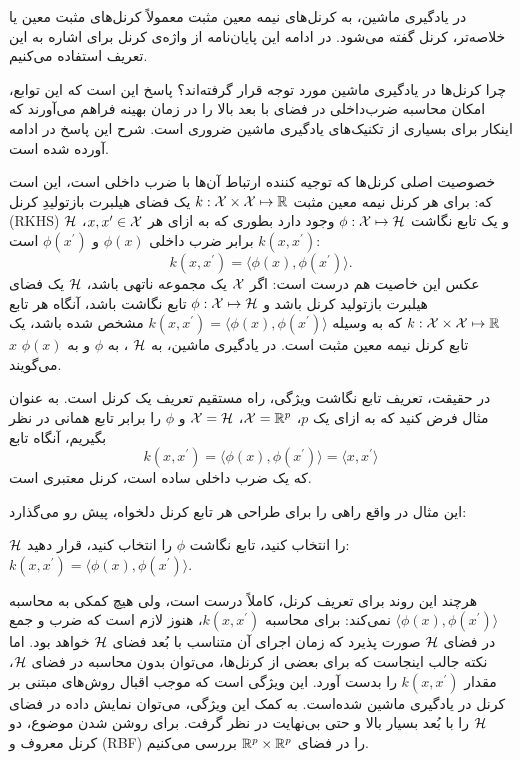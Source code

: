 در یادگیری ماشین، به کرنل‌های نیمه معین مثبت معمولاً کرنل‌های مثبت معین یا خلاصه‌تر، کرنل گفته می‌شود. در ادامه این پایان‌نامه از واژه‌ی کرنل برای اشاره به این تعریف استفاده می‌کنیم.

چرا کرنل‌ها در یادگیری ماشین مورد توجه قرار گرفته‌اند؟ پاسخ این است که این توابع، امکان محاسبه ضرب‌داخلی در فضای با بعد بالا را در زمان بهینه فراهم می‌آورند که اینکار برای بسیاری از تکنیک‌های یادگیری ماشین ضروری است. شرح این پاسخ در ادامه آورده شده است.

خصوصیت اصلی کرنل‌ها که توجیه کننده ارتباط آن‌ها با ضرب داخلی است، این است که: برای هر کرنل نیمه معین مثبت $k: \mathcal{X} \times \mathcal{X} \mapsto \mathbb{R}$ یک فضای هیلبرت  بازتولیدِ کرنل 
(RKHS) $\mathcal{H}$ و یک تابع نگاشت $\phi: \mathcal{X} \mapsto \mathcal{H}$ وجود دارد بطوری که
به ازای هر $x,x^\prime \in \mathcal{X}$،
$k(x,x^\prime)$
 برابر ضرب داخلی 
 $\phi(x)$ 
 و $\phi(x^\prime)$ است:
\begin{equation*}
k(x,x^\prime) = \langle\phi(x),\phi(x^\prime)\rangle.
\end{equation*}
عکس این خاصیت هم درست است: اگر $\mathcal{X}$ یک مجموعه ناتهی باشد، $\mathcal{H}$ یک فضای هیلبرت بازتولید کرنل باشد و $\phi: \mathcal{X} \mapsto \mathcal{H}$ تابع نگاشت باشد، آنگاه هر تابع $k: \mathcal{X}\times \mathcal{X} \mapsto \mathbb{R}$ که به وسیله $k(x,x^\prime) = \langle\phi(x),\phi(x^\prime)\rangle$ مشخص شده باشد، یک تابع کرنل نیمه معین مثبت است. در یادگیری ماشین، به $\mathcal{H}$ ،
به $\phi$  و
به $\phi(x)$ 
$x$ می‌گویند.

در حقیقت، تعریف تابع نگاشت ویژگی، راه مستقیم تعریف یک کرنل است. به عنوان مثال فرض کنید که به ازای یک $p$، 
$\mathcal{X} = \mathbb{R}^p$، $\mathcal{X} = \mathcal{H}$ و $\phi$ را برابر تابع همانی در نظر بگیریم، آنگاه تابع
\begin{equation*}
k(x,x^\prime) = \langle\phi(x),\phi(x^\prime)\rangle = \langle{x,x^\prime}\rangle
\end{equation*}
که یک ضرب داخلی ساده است، کرنل معتبری است.

این مثال در واقع راهی را برای طراحی هر تابع کرنل دلخواه، پیش رو می‌گذارد:
\begin{enumerate}
 $\mathcal{H}$ را انتخاب کنید،
 تابع نگاشت $\phi$ را انتخاب کنید،
 قرار دهید: $k(x,x^\prime) = \langle\phi(x),\phi(x^\prime)\rangle $.
\end{enumerate}

هرچند این روند برای تعریف کرنل، کاملاً درست است، ولی هیچ کمکی به محاسبه $\langle\phi(x),\phi(x^\prime)\rangle$ نمی‌کند: برای محاسبه $k(x,x^\prime)$، هنوز لازم است که ضرب و جمع در فضای $\mathcal{H}$ صورت پذیرد که زمان اجرای آن متناسب با بُعد فضای $\mathcal{H}$ خواهد بود. اما نکته جالب اینجاست که برای بعضی از کرنل‌ها، می‌توان بدون محاسبه در فضای $\mathcal{H}$، مقدار $k(x,x^\prime)$ را بدست آورد. این ویژگی است که موجب اقبال روش‌های مبتنی بر کرنل در یادگیری ماشین شده‌است. به کمک این ویژگی، می‌توان نمایش داده در فضای $\mathcal{H}$ را با بُعد بسیار بالا و حتی بی‌نهایت در نظر گرفت. برای روشن شدن موضوع، دو کرنل معروف  و (RBF) را در فضای $\mathbb{R}^p\times \mathbb{R}^p$ بررسی می‌کنیم.

